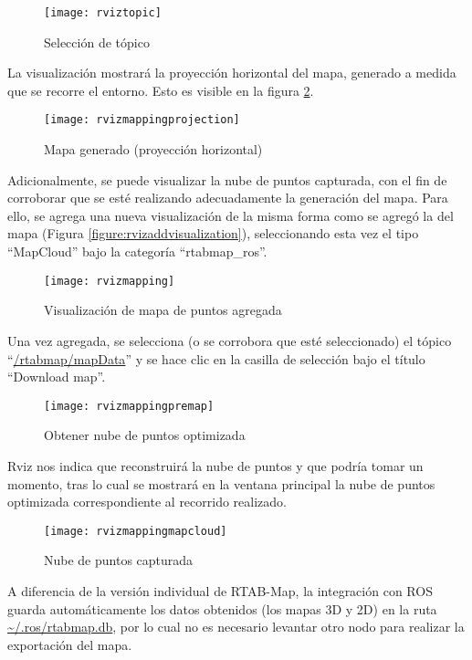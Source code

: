 \begin{figure}[H]
\centering
\texttt{[image: rviztopic]}
\caption{Selección de tópico}
\label{figure:rviztopic}
\end{figure}

La visualización mostrará la proyección horizontal del mapa, generado a medida que se recorre el entorno. Esto es visible en la figura \ref{figure:rvizmappingprojection}.

\begin{figure}[H]
\centering
\texttt{[image: rvizmappingprojection]}
\caption{Mapa generado (proyección horizontal)}
\label{figure:rvizmappingprojection}
\end{figure}

Adicionalmente, se puede visualizar la nube de puntos capturada, con el fin de corroborar que se esté realizando adecuadamente la generación del mapa. Para ello, se agrega una nueva visualización de la misma forma como se agregó la del mapa (Figura \ref{figure:rvizaddvisualization}), seleccionando esta vez el tipo ``MapCloud'' bajo la categoría ``rtabmap\_ros''.

\begin{figure}[H]
\centering
\texttt{[image: rvizmapping]}
\caption{Visualización de mapa de puntos agregada}
\label{figure:rvizmapping}
\end{figure}

Una vez agregada, se selecciona (o se corrobora que esté seleccionado) el tópico ``\url{/rtabmap/mapData}'' y se hace clic en la casilla de selección bajo el título ``Download map''.

\begin{figure}[H]
\centering
\texttt{[image: rvizmappingpremap]}
\caption{Obtener nube de puntos optimizada}
\label{figure:rvizmappingpremap}
\end{figure}

Rviz nos indica que reconstruirá la nube de puntos y que podría tomar un momento, tras lo cual se mostrará en la ventana principal la nube de puntos optimizada correspondiente al recorrido realizado.

\begin{figure}[H]
\centering
\texttt{[image: rvizmappingmapcloud]}
\caption{Nube de puntos capturada}
\label{figure:rvizmappingmapcloud}
\end{figure}

A diferencia de la versión individual de RTAB-Map, la integración con ROS guarda automáticamente los datos obtenidos (los mapas 3D y 2D) en la ruta \url{~/.ros/rtabmap.db}, por lo cual no es necesario levantar otro nodo para realizar la exportación del mapa.

